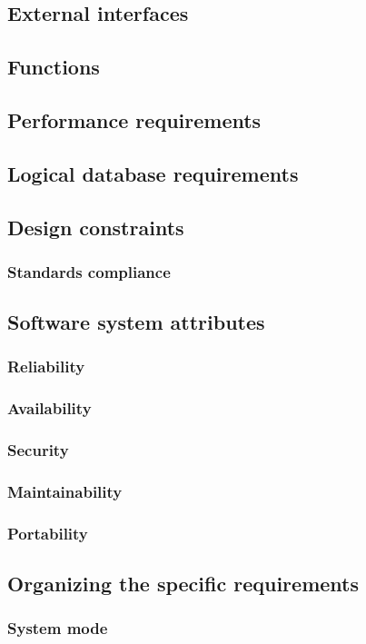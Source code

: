 \documentclass[draftclsnofoot,onecolumn,letterpaper,10pt,compsoc]{IEEEtran}
\begin{document}
	\subsection{External interfaces}
	\subsection{Functions}
	\subsection{Performance requirements}
	\subsection{Logical database requirements}
	\subsection{Design constraints}
		\subsubsection{Standards compliance}
	\subsection{Software system attributes}
		\subsubsection{Reliability}
		\subsubsection{Availability}
		\subsubsection{Security}
		\subsubsection{Maintainability}
		\subsubsection{Portability}
	\subsection{Organizing the specific requirements}
		\subsubsection{System mode}
\end{document}
